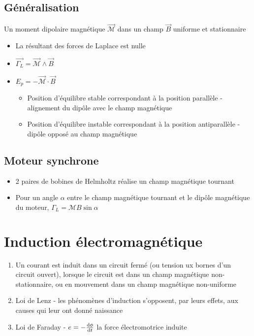 \documentclass[openany]{book}
\begin{document}
\subsection{Généralisation}
Un moment dipolaire magnétique $\vec{\mathcal{M}}$ dans un champ $\vec{B}$ uniforme et stationnaire
\begin{itemize}
    \item La résultant des forces de Laplace est nulle
    \item $\vec{\Gamma_L} = \vec{\mathcal{M}}\wedge \vec{B}$
    \item $E_p = - \vec{\mathcal{M}} \cdot \vec{B}$
    \begin{itemize}
        \item Position d'équilibre stable correspondant à la position parallèle - alignement du dipôle avec le champ magnétique
        \item Position d'équilibre instable correspondant à la position antiparallèle - dipôle opposé au champ magnétique
    \end{itemize}
\end{itemize}

\subsection{Moteur synchrone}
\begin{itemize}
    \item 2 paires de bobines de Helmholtz réalise un champ magnétique tournant
    \item Pour un angle $\alpha$ entre le champ magnétique tournant et le dipôle magnétique du moteur, $\Gamma_L = \mathcal{M}B \sin \alpha$
\end{itemize}

\section{Induction électromagnétique}
\begin{enumerate}
    \item Un courant est induit dans un circuit fermé (ou tension ux bornes d'un circuit ouvert), lorsque le circuit est dans un champ magnétique non-stationnaire, ou en mouvement dans un champ magnétique non-uniforme
    \item Loi de Lenz - les phénomènes d'induction s'opposent, par leurs effets, aux causes qui leur ont donné naissance
    \item Loi de Faraday - $e = - \frac{\text{d} \phi}{\text{d}t}$ la force électromotrice induite
\end{enumerate}
\end{document}
